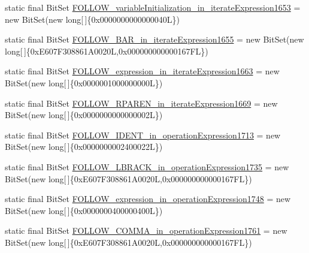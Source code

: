 \begin{DoxyCompactItemize}
static final Bit\-Set \hyperlink{classorg_1_1tzi_1_1use_1_1parser_1_1ocl_1_1_o_c_l_parser_ae276bd07889b377eab59f6540086ed20}{F\-O\-L\-L\-O\-W\-\_\-variable\-Initialization\-\_\-in\-\_\-iterate\-Expression1653} = new Bit\-Set(new long\mbox{[}$\,$\mbox{]}\{0x0000000000000040\-L\})
\item 
static final Bit\-Set \hyperlink{classorg_1_1tzi_1_1use_1_1parser_1_1ocl_1_1_o_c_l_parser_a4b57e2751eb82fec57681d5ecd4718dc}{F\-O\-L\-L\-O\-W\-\_\-\-B\-A\-R\-\_\-in\-\_\-iterate\-Expression1655} = new Bit\-Set(new long\mbox{[}$\,$\mbox{]}\{0x\-E607\-F308861\-A0020\-L,0x000000000000167\-F\-L\})
\item 
static final Bit\-Set \hyperlink{classorg_1_1tzi_1_1use_1_1parser_1_1ocl_1_1_o_c_l_parser_ae1bb43118a2f0e610fb7c688397667b1}{F\-O\-L\-L\-O\-W\-\_\-expression\-\_\-in\-\_\-iterate\-Expression1663} = new Bit\-Set(new long\mbox{[}$\,$\mbox{]}\{0x0000001000000000\-L\})
\item 
static final Bit\-Set \hyperlink{classorg_1_1tzi_1_1use_1_1parser_1_1ocl_1_1_o_c_l_parser_a363343357420c2e08cce577491d07f3c}{F\-O\-L\-L\-O\-W\-\_\-\-R\-P\-A\-R\-E\-N\-\_\-in\-\_\-iterate\-Expression1669} = new Bit\-Set(new long\mbox{[}$\,$\mbox{]}\{0x0000000000000002\-L\})
\item 
static final Bit\-Set \hyperlink{classorg_1_1tzi_1_1use_1_1parser_1_1ocl_1_1_o_c_l_parser_a360a276c6f50fcee80b740ce79873f7f}{F\-O\-L\-L\-O\-W\-\_\-\-I\-D\-E\-N\-T\-\_\-in\-\_\-operation\-Expression1713} = new Bit\-Set(new long\mbox{[}$\,$\mbox{]}\{0x0000000002400022\-L\})
\item 
static final Bit\-Set \hyperlink{classorg_1_1tzi_1_1use_1_1parser_1_1ocl_1_1_o_c_l_parser_a52c8b4ddc9b8c0b72f0de7453b770f5d}{F\-O\-L\-L\-O\-W\-\_\-\-L\-B\-R\-A\-C\-K\-\_\-in\-\_\-operation\-Expression1735} = new Bit\-Set(new long\mbox{[}$\,$\mbox{]}\{0x\-E607\-F308861\-A0020\-L,0x000000000000167\-F\-L\})
\item 
static final Bit\-Set \hyperlink{classorg_1_1tzi_1_1use_1_1parser_1_1ocl_1_1_o_c_l_parser_ac73033454f609d6de73241cfa8ff6af1}{F\-O\-L\-L\-O\-W\-\_\-expression\-\_\-in\-\_\-operation\-Expression1748} = new Bit\-Set(new long\mbox{[}$\,$\mbox{]}\{0x0000000400000400\-L\})
\item 
static final Bit\-Set \hyperlink{classorg_1_1tzi_1_1use_1_1parser_1_1ocl_1_1_o_c_l_parser_aa0c9f2c78e917d5c6ef4bfd4fcabc3b2}{F\-O\-L\-L\-O\-W\-\_\-\-C\-O\-M\-M\-A\-\_\-in\-\_\-operation\-Expression1761} = new Bit\-Set(new long\mbox{[}$\,$\mbox{]}\{0x\-E607\-F308861\-A0020\-L,0x000000000000167\-F\-L\})
\item 

\end{DoxyCompactItemize}
